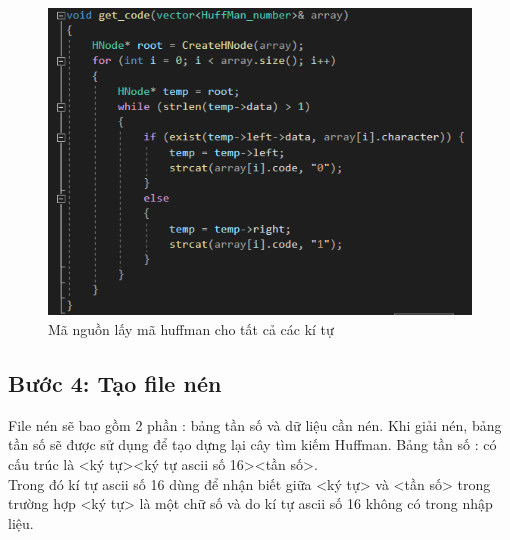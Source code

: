 \documentclass[14pt]{extreport}
\begin{document}
\begin{center}
    \begin{figure}[H]
    \begin{center}
     \includegraphics[scale=1.0]{get_code_source.PNG}
    \end{center}
    \caption{Mã nguồn lấy mã huffman cho tất cả các kí tự}
    \label{refhinh1}
    \end{figure}
\end{center}

\subsection{Bước 4: Tạo file nén}
File nén sẽ bao gồm 2 phần : bảng tần số và dữ liệu cần nén. Khi giải nén, bảng tần số sẽ được sử dụng để tạo dựng lại cây tìm kiếm Huffman.
Bảng tần số : có cấu trúc là <ký tự><ký tự ascii số 16><tần số>.\\Trong đó kí tự ascii số 16 dùng để nhận biết giữa <ký tự> và <tần số> trong trường hợp <ký tự> là một chữ số và do kí tự ascii số 16 không có trong nhập liệu.
\end{document}
